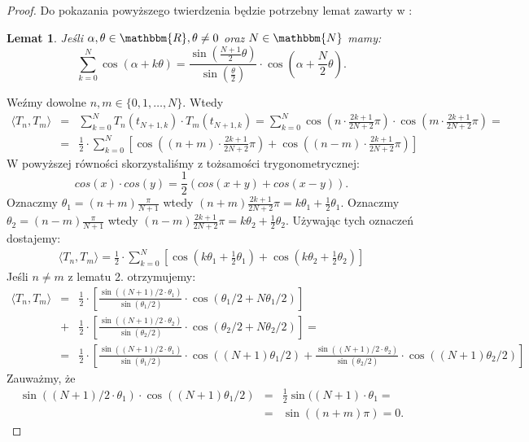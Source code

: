 \documentclass[12pt,wide]{mwart}
\newtheorem{lem}{Lemat}
\begin{document}
\begin{proof}
Do pokazania powyższego twierdzenia będzie potrzebny lemat zawarty w \cite{cos}:
\begin{lem}
Jeśli $\alpha,\theta \in \mathbbm{R}, \theta \neq 0$ oraz $N \in \mathbbm{N}$ mamy:
$$
\sum_{k=0}^N \cos(\alpha + k\theta) = \frac{\sin(\frac{N+1}{2}\theta)}{\sin(\frac{\theta}{2})}\cdot \cos(\alpha + \frac{N}{2}\theta).
$$
\end{lem}

Weźmy dowolne $n,m \in \{0,1,\ldots,N\}$. Wtedy
\begin{eqnarray*}
\langle T_n,T_m \rangle &=& \sum_{k=0}^N T_n(t_{N+1,k})\cdot T_m(t_{N+1,k}) =  \sum_{k=0}^N \cos\left(n \cdot \frac{2k+1}{2N+2}\pi\right)\cdot \cos\left(m \cdot \frac{2k+1}{2N+2}\pi\right) = \\&=& \frac{1}{2}\cdot \sum_{k=0}^N \left[\cos\left((n+m)\cdot \frac{2k+1}{2N+2}\pi\right) + \cos\left((n-m)\cdot \frac{2k+1}{2N+2}\pi\right)\right]
\end{eqnarray*}
W powyższej równości skorzystaliśmy z tożsamości trygonometrycznej: $$cos(x) \cdot cos(y) = \frac{1}{2}(cos(x+y)+cos(x-y)).$$ Oznaczmy $\theta_1 = (n+m)\frac{\pi}{N+1}$ wtedy $(n+m)\frac{2k+1}{2N+2}\pi = k\theta_1 + \frac{1}{2}\theta_1$.
Oznaczmy $\theta_2 = (n-m)\frac{\pi}{N+1}$ wtedy $(n-m)\frac{2k+1}{2N+2}\pi = k\theta_2 + \frac{1}{2}\theta_2$.
Używając tych oznaczeń dostajemy:
\begin{eqnarray}\label{rownosc}
\langle T_n,T_m \rangle = \frac{1}{2} \cdot \sum_{k=0}^N \left[\cos(k\theta_1 + \frac{1}{2}\theta_1) + \cos(k\theta_2 + \frac{1}{2}\theta_2)\right] 
\end{eqnarray}
Jeśli $n \neq m$ z lematu 2. otrzymujemy:
\begin{eqnarray*}
\langle T_n,T_m \rangle &=& \frac{1}{2} \cdot \left[ \frac{\sin((N+1)/2 \cdot \theta_1)}{\sin(\theta_1 /2)}\cdot \cos(\theta_1 /2 + N\theta_1 /2)\right]\\ &+& \frac{1}{2} \cdot \left[\frac{\sin((N+1)/2 \cdot \theta_2)}{\sin(\theta_2 /2)}\cdot \cos(\theta_2 /2 + N\theta_2 /2) \right] =\\ 
&=& \frac{1}{2} \cdot \left[\frac{\sin((N+1)/2 \cdot \theta_1)}{\sin(\theta_1 /2)}\cdot \cos((N+1)\theta_1 /2) + \frac{\sin((N+1)/2 \cdot \theta_2)}{\sin(\theta_2 /2)}\cdot \cos((N+1)\theta_2 /2) \right]
\end{eqnarray*}
Zauważmy, że
\begin{eqnarray*}
\sin((N+1)/2 \cdot \theta_1) \cdot \cos((N+1)\theta_1 /2) &=& \frac{1}{2} \sin((N+1) \cdot \theta_1 =\\ &=& \sin((n+m)\pi) = 0.

\end{eqnarray*}
\end{proof}
\end{document}
